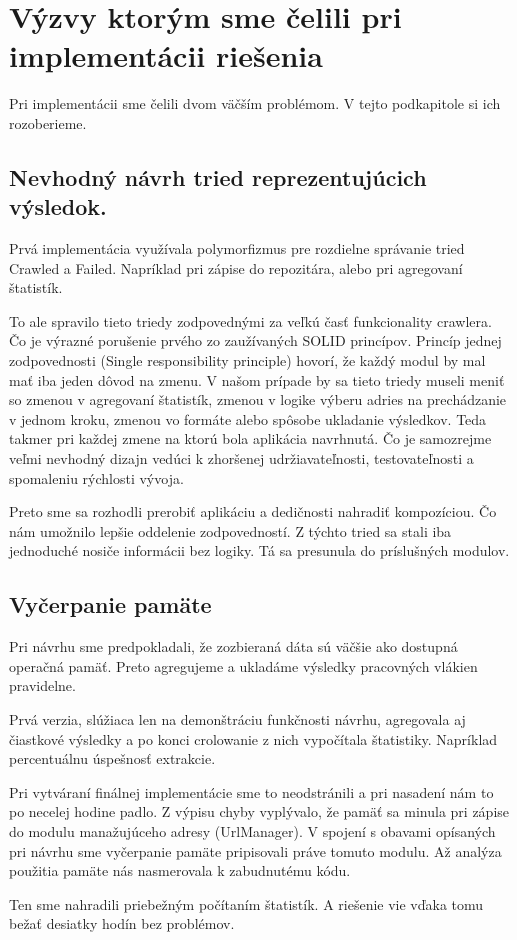 \section{Výzvy ktorým sme čelili pri implementácii riešenia}
Pri implementácii sme čelili dvom väčším problémom. V tejto podkapitole si ich rozoberieme.

\subsection{Nevhodný návrh tried reprezentujúcich výsledok.}
Prvá implementácia využívala polymorfizmus pre rozdielne správanie tried Crawled a Failed. Napríklad pri zápise do repozitára, alebo pri agregovaní štatistík. 

To ale spravilo tieto triedy zodpovednými za veľkú časť funkcionality crawlera. Čo je výrazné porušenie prvého zo zaužívaných SOLID princípov. Princíp jednej zodpovednosti (Single responsibility principle) hovorí, že každý modul by mal mať iba jeden dôvod na zmenu. V našom prípade by sa tieto triedy museli meniť so zmenou v agregovaní štatistík, zmenou v logike výberu adries na prechádzanie v jednom kroku, zmenou vo formáte alebo spôsobe ukladanie výsledkov. Teda takmer pri každej zmene na ktorú bola aplikácia navrhnutá. Čo je samozrejme veľmi nevhodný dizajn vedúci k zhoršenej udržiavateľnosti, testovateľnosti a spomaleniu rýchlosti vývoja.  

Preto sme sa rozhodli prerobiť aplikáciu a dedičnosti nahradiť kompozíciou. Čo nám umožnilo lepšie oddelenie zodpovedností. Z týchto tried sa stali iba jednoduché nosiče informácii bez logiky. Tá sa presunula do príslušných modulov.

\subsection{Vyčerpanie pamäte}
Pri návrhu sme predpokladali, že zozbieraná dáta sú väčšie ako dostupná operačná pamäť. Preto agregujeme a ukladáme výsledky pracovných vlákien pravidelne. 

Prvá verzia, slúžiaca len na demonštráciu funkčnosti návrhu, agregovala aj čiastkové výsledky a po konci crolowanie z nich vypočítala štatistiky. Napríklad percentuálnu úspešnosť extrakcie. 

Pri vytváraní finálnej implementácie sme to neodstránili a pri nasadení nám to po necelej hodine padlo. Z výpisu chyby vyplývalo, že pamäť sa minula pri zápise do modulu manažujúceho adresy (UrlManager). V spojení s obavami opísaných pri návrhu sme vyčerpanie pamäte pripisovali práve tomuto modulu. Až analýza použitia pamäte nás nasmerovala k zabudnutému kódu. 

Ten sme nahradili priebežným počítaním štatistík. A riešenie vie vďaka tomu bežať desiatky hodín bez problémov.